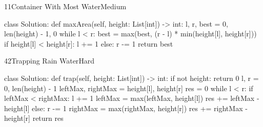 \begin{problem}{11}{Container With Most Water}{Medium}
\begin{code}
class Solution:
    def maxArea(self, height: List[int]) -> int:
        l, r, best = 0, len(height) - 1, 0
        while l < r:
            best = max(best, (r - l) * min(height[l], height[r]))
            if height[l] < height[r]:
                l += 1
            else:
                r -= 1
        return best
\end{code}
\end{problem}

\begin{problem}{42}{Trapping Rain Water}{Hard}
\begin{code}
class Solution:
    def trap(self, height: List[int]) -> int:
        if not height:
            return 0
        l, r = 0, len(height) - 1
        leftMax, rightMax = height[l], height[r]
        res = 0
        while l < r:
            if leftMax < rightMax:
                l += 1
                leftMax = max(leftMax, height[l])
                res += leftMax - height[l]
            else:
                r -= 1
                rightMax = max(rightMax, height[r])
                res += rightMax - height[r]
        return res
\end{code}
\end{problem}

